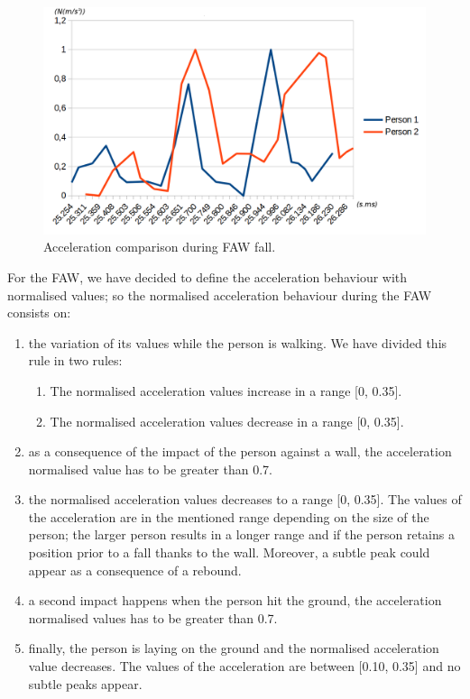 \documentclass[journal]{IEEEtran}
\begin{document}
\begin{figure}[!ht]
  \centering
  \includegraphics[scale=0.2]{img/TwoFallsComparative.png}
  \caption[Acceleration during FAW fall]{Acceleration comparison during FAW fall.}
  \label{fig:FAWcomparison}
\end{figure}

For the FAW, we have decided to define the acceleration behaviour with normalised values; so the 
normalised acceleration behaviour during the FAW consists on:
\begin{enumerate}
 \item the variation of its values while the person is walking. We have divided this rule in two rules:
 \begin{enumerate}
  \item The normalised acceleration values increase in a range [0, 0.35].
  \item The normalised acceleration values decrease in a range [0, 0.35].
 \end{enumerate}
 \item as a consequence of the impact of the person against a wall, the acceleration normalised value 
 has to be greater than 0.7.
 \item the normalised acceleration values decreases to a range [0, 0.35]. The values of the acceleration are 
 in the mentioned range depending on the size of the person; the larger person results in a longer range 
 and if the person retains a position prior to a fall thanks to the wall. Moreover, a subtle peak could 
 appear as a consequence of a rebound.
 \item a second impact happens when the person hit the ground, the acceleration normalised values has to 
 be greater than 0.7.
 \item finally, the person is laying on the ground and the normalised acceleration value decreases. The 
 values of the acceleration are between [0.10, 0.35] and no subtle peaks appear. 
\end{enumerate}
\end{document}
